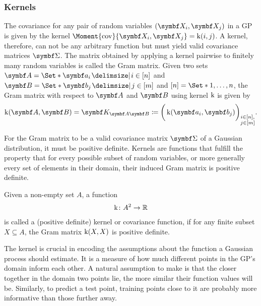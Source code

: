 \subsubsection{Kernels}
The covariance for any pair of random variables $(\rv{X}_i, \mat{X}_j)$ in a GP is given by the kernel $\Moment{\cov}{\rv{X}_i, \rv{X}_j} = \K(i, j)$.
A kernel, therefore, can not be any arbitrary function but must yield valid covariance matrices $\mat{\Sigma}$.
The matrix obtained by applying a kernel pairwise to finitely many random variables is called the Gram matrix.
Given two sets $\mat{A} = \Set*{\mat{a}_i \with i \in [n]}$ and $\mat{B} = \Set*{\mat{b}_j \with j \in [m]}$ and $[n] = \Set*{1, \dots, n}$, the Gram matrix with respect to $\mat{A}$ and $\mat{B}$ using kernel $\operatorname{k}$ is given by
\begin{align}
    \K(\mat{A}, \mat{B}) = \mat{K_{\mat{A}\mat{B}}} \coloneqq \bigg( \K(\mat{a}_i, \mat{b}_j) \bigg)_{\substack{i \in [n], \\ j \in [m]}}.
\end{align}

For the Gram matrix to be a valid covariance matrix $\mat{\Sigma}$ of a Gaussian distribution, it must be positive definite.
Kernels are functions that fulfill the property that for every possible subset of random variables, or more generally every set of elements in their domain, their induced Gram matrix is positive definite.
\begin{definition}[Kernel]
    Given a non-empty set $A$, a function
    \begin{align}
        \operatorname{k} \colon A^2 \to \mathbb{R}
    \end{align}
    is called a (positive definite) kernel or covariance function, if for any finite subset $X \subseteq A$, the Gram matrix $\operatorname{k}(X, X)$ is positive definite.
\end{definition}
The kernel is crucial in encoding the assumptions about the function a Gaussian process should estimate.
It is a measure of how much different points in the GP's domain inform each other.
A natural assumption to make is that the closer together in the domain two points lie, the more similar their function values will be.
Similarly, to predict a test point, training points close to it are probably more informative than those further away.

